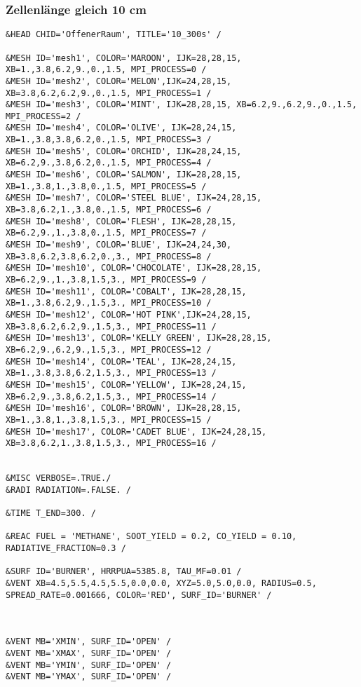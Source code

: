 \subsubsection{Zellenlänge gleich 10 cm}
\begin{lstlisting}[emptylines=0,basicstyle=\tiny]
 &HEAD CHID='OffenerRaum', TITLE='10_300s' /

&MESH ID='mesh1', COLOR='MAROON', IJK=28,28,15, XB=1.,3.8,6.2,9.,0.,1.5, MPI_PROCESS=0 /
&MESH ID='mesh2', COLOR='MELON',IJK=24,28,15, XB=3.8,6.2,6.2,9.,0.,1.5, MPI_PROCESS=1 /
&MESH ID='mesh3', COLOR='MINT', IJK=28,28,15, XB=6.2,9.,6.2,9.,0.,1.5, MPI_PROCESS=2 /
&MESH ID='mesh4', COLOR='OLIVE', IJK=28,24,15, XB=1.,3.8,3.8,6.2,0.,1.5, MPI_PROCESS=3 /
&MESH ID='mesh5', COLOR='ORCHID', IJK=28,24,15, XB=6.2,9.,3.8,6.2,0.,1.5, MPI_PROCESS=4 /
&MESH ID='mesh6', COLOR='SALMON', IJK=28,28,15, XB=1.,3.8,1.,3.8,0.,1.5, MPI_PROCESS=5 /
&MESH ID='mesh7', COLOR='STEEL BLUE', IJK=24,28,15, XB=3.8,6.2,1.,3.8,0.,1.5, MPI_PROCESS=6 /
&MESH ID='mesh8', COLOR='FLESH', IJK=28,28,15, XB=6.2,9.,1.,3.8,0.,1.5, MPI_PROCESS=7 /
&MESH ID='mesh9', COLOR='BLUE', IJK=24,24,30, XB=3.8,6.2,3.8,6.2,0.,3., MPI_PROCESS=8 /
&MESH ID='mesh10', COLOR='CHOCOLATE', IJK=28,28,15, XB=6.2,9.,1.,3.8,1.5,3., MPI_PROCESS=9 /
&MESH ID='mesh11', COLOR='COBALT', IJK=28,28,15, XB=1.,3.8,6.2,9.,1.5,3., MPI_PROCESS=10 /
&MESH ID='mesh12', COLOR='HOT PINK',IJK=24,28,15, XB=3.8,6.2,6.2,9.,1.5,3., MPI_PROCESS=11 /
&MESH ID='mesh13', COLOR='KELLY GREEN', IJK=28,28,15, XB=6.2,9.,6.2,9.,1.5,3., MPI_PROCESS=12 /
&MESH ID='mesh14', COLOR='TEAL', IJK=28,24,15, XB=1.,3.8,3.8,6.2,1.5,3., MPI_PROCESS=13 /
&MESH ID='mesh15', COLOR='YELLOW', IJK=28,24,15, XB=6.2,9.,3.8,6.2,1.5,3., MPI_PROCESS=14 /
&MESH ID='mesh16', COLOR='BROWN', IJK=28,28,15, XB=1.,3.8,1.,3.8,1.5,3., MPI_PROCESS=15 /
&MESH ID='mesh17', COLOR='CADET BLUE', IJK=24,28,15, XB=3.8,6.2,1.,3.8,1.5,3., MPI_PROCESS=16 /


&MISC VERBOSE=.TRUE./
&RADI RADIATION=.FALSE. /

&TIME T_END=300. /

&REAC FUEL = 'METHANE', SOOT_YIELD = 0.2, CO_YIELD = 0.10, RADIATIVE_FRACTION=0.3 /

&SURF ID='BURNER', HRRPUA=5385.8, TAU_MF=0.01 /
&VENT XB=4.5,5.5,4.5,5.5,0.0,0.0, XYZ=5.0,5.0,0.0, RADIUS=0.5, SPREAD_RATE=0.001666, COLOR='RED', SURF_ID='BURNER' /



&VENT MB='XMIN', SURF_ID='OPEN' /  
&VENT MB='XMAX', SURF_ID='OPEN' /  
&VENT MB='YMIN', SURF_ID='OPEN' /  
&VENT MB='YMAX', SURF_ID='OPEN' / 


\end{lstlisting}
